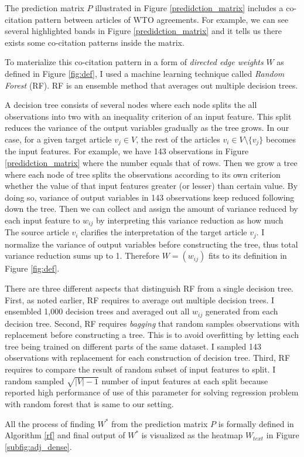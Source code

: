 The prediction matrix $P$ illustrated in Figure \ref{predidction_matrix}
includes a co-citation pattern between articles of WTO agreements. For example,
we can see several highlighted bands in Figure \ref{predidction_matrix}
and it tells us there exists some co-citation patterns inside the matrix.
 
To materialize this co-citation pattern in a form of \textit{directed edge weights} $W$ as defined in Figure \ref{fig:def},
I used a machine learning technique called \textit{Random Forest} (RF). RF is an ensemble method that averages out
multiple decision trees.
 
A decision tree consists of several nodes where each node splits the all observations into two with an inequality criterion of an input feature.
This split reduces the variance of the output variables gradually as the tree grows.
In our case, for a given target article $v_j \in V$, the rest of the articles $v_i \in V \setminus \{v_j\}$ becomes the input features.
For example, we have 143 observations in Figure \ref{predidction_matrix} where the number equals that of rows.
Then we grow a tree where each node of tree splits
the observations according to its own criterion
whether the value of that input features greater (or lesser) than certain value.
By doing so,
variance of output variables in 143 observations keep reduced following down the tree.
Then we can collect and assign the amount of variance reduced by each input feature to $w_{ij}$
by interpreting this variance reduction as how much
The source article $v_i$ clarifies the interpretation of the target article $v_j$.
I normalize the variance of output variables before constructing the tree, thus total variance reduction
sums up to 1. Therefore $W = (w_{ij})$ fits to its definition in Figure \ref{fig:def}.
 
There are three different aspects that distinguish RF from a single decision tree.
First, as noted earlier, RF requires to average out multiple decision trees.
I ensembled 1,000 decision trees and averaged out all $w_{ij}$ generated from each decision tree.
Second, RF requires \textit{bagging} that random samples observations with replacement before constructing a tree.
This is to avoid overfitting by letting each tree being trained on different parts of the same dataset.
I sampled 143 observations with replacement for each construction of decision tree.
Third, RF requires to compare the result of random subset of input features to split.
I random sampled $\sqrt{|V|-1}$ number of input features at each split because \cite{genie3} reported high performance of use of this parameter for solving regression problem with random forest that is same to our setting.
 
All the process of finding $W^*$ from the prediction matrix $P$ is formally defined in Algorithm \ref{rf} and final output of $W^*$ is visualized as the heatmap $W_{text}$ in Figure \ref{subfig:adj_dense}.
